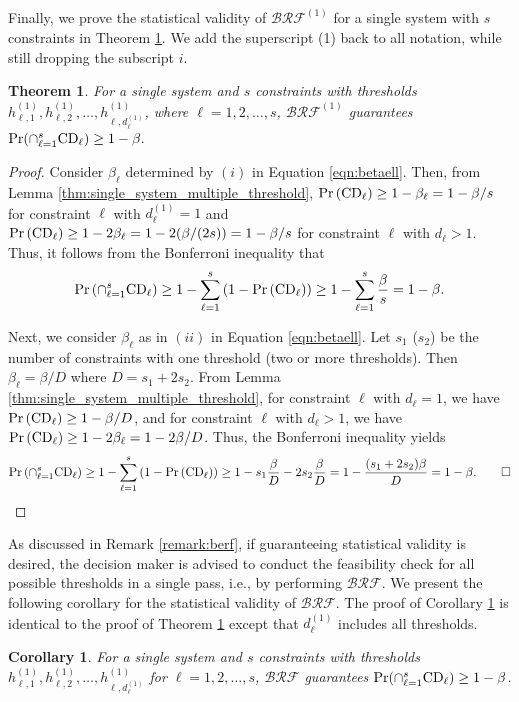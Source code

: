 \documentclass[11pt]{article}
\newtheorem{theorem}{Theorem}
\newtheorem{corollary}{Corollary}
\begin{document}
Finally, we prove the statistical validity of $\mathcal{BRF}^{(1)}$ for a single system with $s$ constraints in Theorem \ref{thm:single_system_multiple}. We add the superscript (1) back to all notation, while still dropping the subscript $i$. 
\begin{theorem}
\label{thm:single_system_multiple}
For a single system and $s$ constraints with thresholds $h_{\ell,1}^{(1)},h_{\ell,2}^{(1)},\ldots,h_{\ell, d_\ell^{(1)}}^{(1)}$, where $\ell=1,2,\ldots, s$, $\mathcal{BRF}^{(1)}$ guarantees $\Pr (\cap_{\ell=1}^s {\rm CD}_\ell)  \ge 1 - \beta.$
\end{theorem}
\begin{proof}

\renewcommand{\qedsymbol}{}

Consider $\beta_\ell$ determined by $(i)$ in Equation \eqref{eqn:betaell}. 
Then, from Lemma \ref{thm:single_system_multiple_threshold}, $\Pr\left( {\rm CD}_{\ell} \right) \ge 1 - \beta_\ell = 1 - \beta/s$  for constraint $\ell$ with $d_\ell^{(1)}=1$ and 
$\Pr\left( {\rm CD}_{\ell} \right)  \ge 1 - 2 \beta_\ell = 1 - 2 (\beta/(2s)) = 1 - \beta/s$ for constraint $\ell$ with $d_\ell >1$. Thus, it follows from the Bonferroni inequality that 
\[
\Pr\left( \cap_{\ell=1}^s {\rm CD}_{\ell} \right) \ge 1 - \sum_{\ell=1}^s \left(1 - \Pr\left( {\rm CD}_\ell \right) \right) \ge 1 - \sum_{\ell=1}^s {\beta \over s} = 1 - \beta.
\]

Next, we consider $\beta_\ell$ as in $(ii)$ in Equation \eqref{eqn:betaell}. Let $s_1$ ($s_2$) be the number of constraints with one threshold (two or more thresholds). Then $\beta_\ell = \beta/D$ where $D=s_1+2s_2$. From Lemma \ref{thm:single_system_multiple_threshold}, for constraint $\ell$ with $d_\ell=1$, we have $\Pr\left( {\rm CD}_{\ell} \right) \ge 1 - \beta/D$, and for constraint $\ell$ with $d_\ell >1$, we have  
$\Pr\left( {\rm CD}_{\ell} \right)  \ge 1 - 2 \beta_\ell = 1 - 2 \beta/D$. Thus, the Bonferroni inequality yields
\begin{align*}
    \Pr\left( \cap_{\ell=1}^s {\rm CD}_{\ell} \right) \ge 1 - \sum_{\ell=1}^s \left(1 - \Pr\left( {\rm CD}_\ell \right)\right) \ge 1 -  s_1 {\beta \over D} - 2 s_2 {\beta \over D} = 1 - {(s_1 + 2s_2) \beta \over D } = 1 - \beta. 
    \tag*{$\square$}
\end{align*}
\end{proof}
\vspace{-0.8cm}
As discussed in Remark \ref{remark:berf}, if guaranteeing statistical validity is desired, the decision maker is advised to conduct the feasibility check for all possible thresholds in a single pass, i.e., by performing $\mathcal{BRF}$. We present the following corollary for the statistical validity of $\mathcal{BRF}$. The proof of Corollary \ref{cor:berf} is identical to the proof of Theorem \ref{thm:single_system_multiple} except that $d_\ell^{(1)}$ includes all thresholds. 
\begin{corollary}
\label{cor:berf}
    For a single system and $s$ constraints with thresholds $h_{\ell,1}^{(1)}, h_{\ell, 2}^{(1)}, \ldots, h_{\ell,d_\ell^{(1)}}^{(1)}$ for $\ell=1,2,\ldots,s$, $\mathcal{BRF}$ guarantees $\Pr (\cap_{\ell=1}^s {\rm CD}_\ell)\geq 1-\beta$.
\end{corollary}
\end{document}
